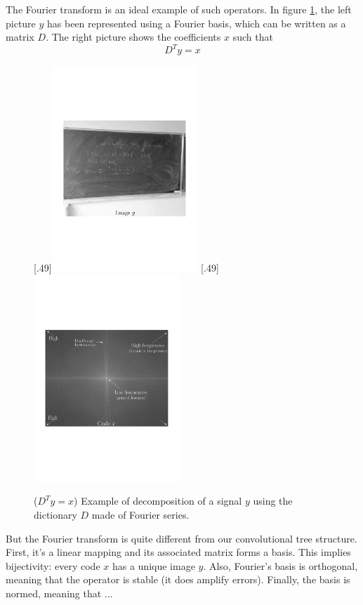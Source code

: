 The Fourier transform is an ideal example of such operators. In figure \ref{explefourier}, the left picture $y$ has been represented using a Fourier basis, which can be written as a matrix $D$. The right picture shows the coefficients $x$ such that
$$D^Ty = x$$
\begin{figure}[!h]
%
  [.49\linewidth]{\includegraphics[width=0.49\textwidth]{figures/exple_fourier_spacial.pdf}}
  [.49\linewidth]{\includegraphics[width=0.49\textwidth]{figures/exple_fourier_frequen.pdf}}
  \caption{ ($D^Ty=x$) Example of decomposition of a signal $y$ using the dictionary $D$ made of Fourier series.} \label{explefourier}
\end{figure}
But the Fourier transform is quite different from our convolutional tree structure. First, it's a linear mapping and its associated matrix forms a basis. This implies bijectivity: every code $x$ has a unique image $y$. Also, Fourier's basis is orthogonal, meaning that the operator is stable (it does amplify errors). Finally, the basis is normed, meaning that ...

